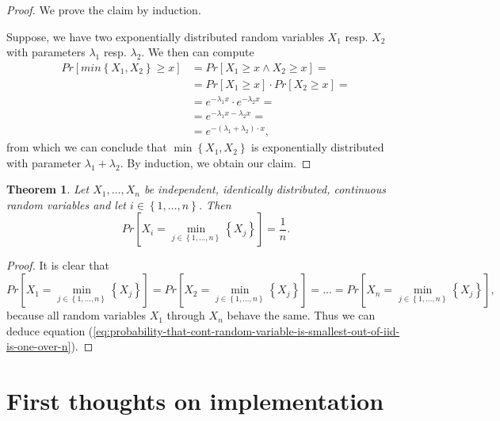\documentclass[letter]{report}
\newtheorem{theorem}{Theorem}[chapter]
\newcommand{\p}[1]{Pr\left[#1\right]}
\begin{document}
\begin{proof}
  We prove the claim by induction. 

  Suppose, we have two exponentially distributed random variables $X_1$ resp. $X_2$ with parameters $\lambda_1$ resp. $\lambda_2$. We then can compute
  \begin{align*}
    \p{min\left\{ X_1,X_2 \right\} \geq x} & = \p{X_1 \geq x \wedge X_2 \geq x} = \\ 
    & = \p{X_1 \geq x}\cdot\p{X_2 \geq x} = \\
    & = e^{-\lambda_1 x} \cdot e^{-\lambda_2 x} = \\
    & = e^{-\lambda_1 x - \lambda_2 x} = \\
    & = e^{-\left( \lambda_1+\lambda_2 \right) \cdot x},
  \end{align*}
  from which we can conclude that $\min\left\{ X_1,X_2 \right\}$ is exponentially distributed with parameter $\lambda_1 + \lambda_2$. By induction, we obtain our claim.
\end{proof}

\begin{theorem}
Let $X_1,\dots,X_n$ be independent, identically distributed, continuous random variables and let $i\in\left\{ 1,\dots,n \right\}$. Then 
\begin{equation}
\label{eq:probability-that-cont-random-variable-is-smallest-out-of-iid-is-one-over-n}
\p{X_i = \min_{j\in\left\{ 1,\dots,n \right\}}\left\{ X_j \right\}} = \frac{1}{n}.
\end{equation}
\end{theorem}

\begin{proof}
  It is clear that 
  \begin{equation*}
    \p{X_1 = \min_{j\in\left\{ 1,\dots,n \right\}}\left\{ X_j \right\}} = \p{X_2 = \min_{j\in\left\{ 1,\dots,n \right\}}\left\{ X_j \right\}} = \dots = \p{X_n = \min_{j\in\left\{ 1,\dots,n \right\}}\left\{ X_j \right\}},
  \end{equation*}
because all random variables $X_1$ through $X_n$ behave the same. Thus we can deduce equation (\ref{eq:probability-that-cont-random-variable-is-smallest-out-of-iid-is-one-over-n}).
\end{proof}

\chapter{First thoughts on implementation}
\label{chap:first-thoughts-on-implementation}
\end{document}
